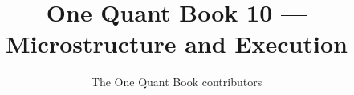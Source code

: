 \documentclass[11pt,a4paper,twoside,openany]{book}
\title{One Quant Book 10 --- Microstructure and Execution}
\author{The One Quant Book contributors}
\date{\bookdate}
\begin{document}
\frontmatter



\tableofcontents

\mainmatter


\appendix
\part{\omsolutionspart}


\backmatter
\printindex
\end{document}
